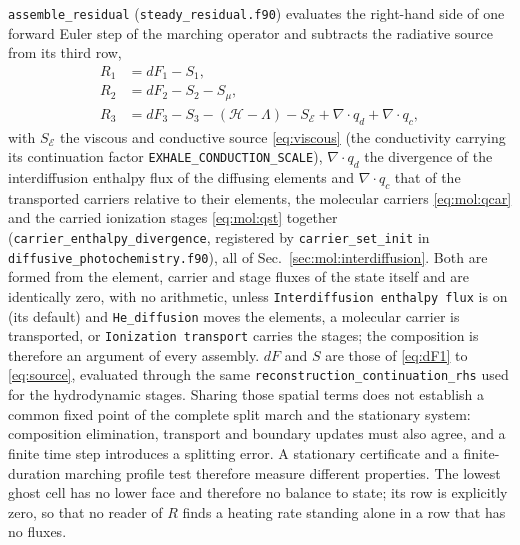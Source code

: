 \texttt{assemble\_residual} (\texttt{steady\_residual.f90}) evaluates the
right-hand side of one forward Euler step of the marching operator and
subtracts the radiative source from its third row,
%
\begin{equation}
  \begin{aligned}
    R_1 &= dF_1 - S_1, \\
    R_2 &= dF_2 - S_2 - S_\mu, \\
    R_3 &= dF_3 - S_3 - (\mathcal{H} - \Lambda) - S_{\mathcal{E}}
           + \nabla\!\cdot q_d + \nabla\!\cdot q_c,
  \end{aligned}
  \label{eq:residual}
\end{equation}
%
with $S_{\mathcal{E}}$ the viscous and conductive source \eqref{eq:viscous}
(the conductivity carrying its continuation factor
\texttt{EXHALE\_CONDUCTION\_SCALE}), $\nabla\!\cdot q_d$ the divergence of the
interdiffusion enthalpy flux of the diffusing elements and
$\nabla\!\cdot q_c$ that of the transported carriers relative to their
elements, the molecular carriers \eqref{eq:mol:qcar} and the carried
ionization stages \eqref{eq:mol:qst} together
(\texttt{carrier\_enthalpy\_divergence}, registered by
\texttt{carrier\_set\_init} in \texttt{diffusive\_photochemistry.f90}), all of
Sec.~\ref{sec:mol:interdiffusion}. Both are formed from the element, carrier
and stage fluxes of the state itself and are identically zero, with no
arithmetic, unless \texttt{Interdiffusion enthalpy flux} is on (its default)
and \texttt{He\_diffusion} moves the elements, a molecular carrier is
transported, or \texttt{Ionization transport} carries the stages; the
composition is therefore an argument of every assembly.  $dF$ and $S$ are those of \eqref{eq:dF1} to
\eqref{eq:source}, evaluated through
the same \texttt{reconstruction\_continuation\_rhs} used for the
hydrodynamic stages. Sharing those spatial terms does not establish a
common fixed point of the complete split march and the stationary system:
composition elimination, transport and boundary updates must also agree,
and a finite time step introduces a splitting error. A stationary
certificate and a finite-duration marching profile test therefore measure
different properties.  The lowest ghost cell has no lower face and
therefore no balance to state; its row is explicitly zero, so that no reader
of $R$ finds a heating rate standing alone in a row that has no fluxes.

